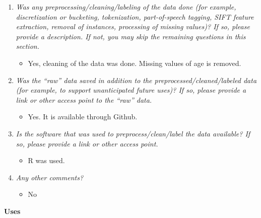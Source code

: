 \documentclass[
]{article}
\providecommand{\tightlist}{%
  \setlength{\itemsep}{0pt}\setlength{\parskip}{0pt}}
\begin{document}
\begin{enumerate}
\def\labelenumi{\arabic{enumi}.}
\tightlist
\item
  \emph{Was any preprocessing/cleaning/labeling of the data done (for example, discretization or bucketing, tokenization, part-of-speech tagging, SIFT feature extraction, removal of instances, processing of missing values)? If so, please provide a description. If not, you may skip the remaining questions in this section.}

  \begin{itemize}
  \tightlist
  \item
    Yes, cleaning of the data was done. Missing values of age is removed.
  \end{itemize}
\item
  \emph{Was the ``raw'' data saved in addition to the preprocessed/cleaned/labeled data (for example, to support unanticipated future uses)? If so, please provide a link or other access point to the ``raw'' data.}

  \begin{itemize}
  \tightlist
  \item
    Yes. It is available through Github.
  \end{itemize}
\item
  \emph{Is the software that was used to preprocess/clean/label the data available? If so, please provide a link or other access point.}

  \begin{itemize}
  \tightlist
  \item
    R was used.
  \end{itemize}
\item
  \emph{Any other comments?}

  \begin{itemize}
  \tightlist
  \item
    No
  \end{itemize}
\end{enumerate}

\textbf{Uses}
\end{document}
